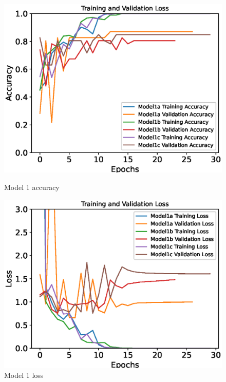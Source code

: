 \begin{figure}[H]
    \centering
    \begin{minipage}{0.49\textwidth}
        \centering
        \includegraphics[width=\textwidth]{./fig/model1/accuracy11.eps}
        \caption{Model 1 accuracy}
        \label{fig:model11_acc}
    \end{minipage}
    \begin{minipage}{0.49\textwidth}
        \centering
        \includegraphics[width=\textwidth]{./fig/model1/loss11.eps}
        \caption{Model 1 loss}
        \label{fig:model11_loss}
    \end{minipage}
\end{figure}


